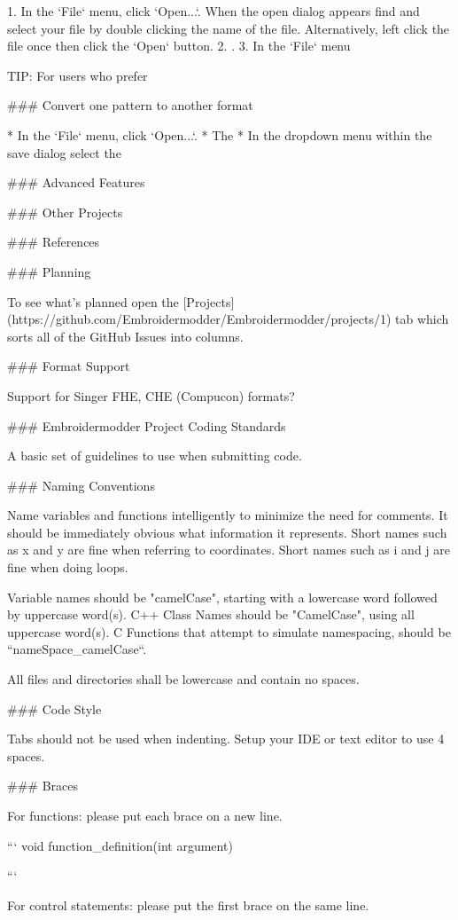 1. In the `File` menu, click `Open...`. When the open dialog appears find and select your file by double clicking the name of the file. Alternatively, left click the file once then click the `Open` button.
2. .
3. In the `File` menu

TIP: For users who prefer

### Convert one pattern to another format

* In the `File` menu, click `Open...`.
* The
* In the dropdown menu within the save dialog select the

### Advanced Features

### Other Projects

### References

### Planning

To see what's planned open the
[Projects](https://github.com/Embroidermodder/Embroidermodder/projects/1)
tab which sorts all of the GitHub Issues into columns.

### Format Support

Support for Singer FHE, CHE (Compucon) formats?

### Embroidermodder Project Coding Standards

A basic set of guidelines to use when submitting code.

### Naming Conventions

Name variables and functions intelligently to minimize the need for
comments. It should be immediately obvious what information it
represents. Short names such as x and y are fine when referring to
coordinates. Short names such as i and j are fine when doing loops.

Variable names should be "camelCase", starting with a lowercase word
followed by uppercase word(s). C++ Class Names should be "CamelCase",
using all uppercase word(s). C Functions that attempt to simulate namespacing,
should be ``nameSpace\_camelCase``.

All files and directories shall be lowercase and contain no spaces.

### Code Style

Tabs should not be used when indenting. Setup your IDE or text editor to use 4 spaces.

### Braces

For functions: please put each brace on a new line.

```
void function\_definition(int argument)
{

}
```

For control statements: please put the first brace on the same line.


